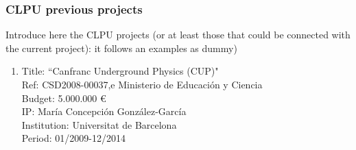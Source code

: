 %
%

\subsubsection*{CLPU previous projects}

Introduce here the CLPU projects (or at least those that could be connected with the current project): it follows an examples as dummy)

\begin{enumerate}

\item Title: ``Canfranc Underground Physics (CUP)"\\
Ref:  CSD2008-00037,e Ministerio de Educaci\'on y Ciencia \\
Budget: 5.000.000 \euro \\
IP: Mar\'ia Concepci\'on Gonz\'alez-Garc\'ia \\
Institution: Universitat de Barcelona \\
Period: 01/2009-12/2014

\end{enumerate}
